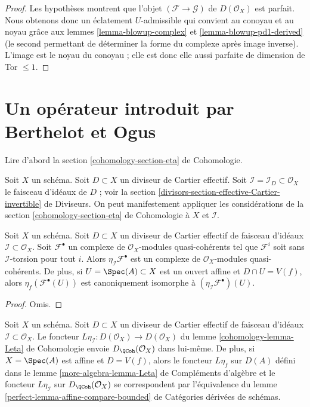 \begin{proof}
Les hypothèses montrent que l'objet $(\mathcal{F} \to \mathcal{G})$
de $D(\mathcal{O}_X)$ est parfait. Nous obtenons donc un éclatement $U$-admissible
qui convient au conoyau et au noyau grâce aux lemmes \ref{lemma-blowup-complex}
et \ref{lemma-blowup-pd1-derived} (le second permettant de déterminer la forme du complexe
après image inverse). L'image est le noyau du conoyau ;
elle est donc elle aussi parfaite de dimension de Tor $\leq 1$.
\end{proof}











\section{Un opérateur introduit par Berthelot et Ogus}
\label{section-eta}

\noindent
Lire d'abord la section \ref{cohomology-section-eta} de Cohomologie.

\medskip\noindent
Soit $X$ un schéma. Soit $D \subset X$ un diviseur de Cartier effectif.
Soit $\mathcal{I} = \mathcal{I}_D \subset \mathcal{O}_X$
le faisceau d'idéaux de $D$ ; voir
la section
\ref{divisors-section-effective-Cartier-invertible} de Diviseurs.
On peut manifestement appliquer les considérations de la section
\ref{cohomology-section-eta} de Cohomologie à $X$ et $\mathcal{I}$.

\begin{lemma}
\label{lemma-eta-stalks}
Soit $X$ un schéma. Soit $D \subset X$ un diviseur de Cartier effectif
de faisceau d'idéaux $\mathcal{I} \subset \mathcal{O}_X$.
Soit $\mathcal{F}^\bullet$ un complexe de
$\mathcal{O}_X$-modules quasi-cohérents tel que $\mathcal{F}^i$ soit
sans $\mathcal{I}$-torsion pour tout $i$. Alors
$\eta_\mathcal{I}\mathcal{F}^\bullet$ est un complexe de
$\mathcal{O}_X$-modules quasi-cohérents. De plus,
si $U = \Spec(A) \subset X$ est un ouvert affine et $D \cap U = V(f)$,
alors $\eta_f(\mathcal{F}^\bullet(U))$ est canoniquement isomorphe
à $(\eta_\mathcal{I}\mathcal{F}^\bullet)(U)$.
\end{lemma}

\begin{proof}
Omis.
\end{proof}

\begin{lemma}
\label{lemma-Leta}
Soit $X$ un schéma. Soit $D \subset X$ un diviseur de Cartier effectif
de faisceau d'idéaux $\mathcal{I} \subset \mathcal{O}_X$.
Le foncteur $L\eta_\mathcal{I} : D(\mathcal{O}_X) \to D(\mathcal{O}_X)$ du
lemme \ref{cohomology-lemma-Leta} de Cohomologie envoie
$D_\QCoh(\mathcal{O}_X)$ dans lui-même.
De plus, si $X = \Spec(A)$ est affine et $D = V(f)$,
alors le foncteur $L\eta_f$ sur $D(A)$ défini dans le
lemme \ref{more-algebra-lemma-Leta} de Compléments d'algèbre
et le foncteur $L\eta_\mathcal{I}$ sur $D_\QCoh(\mathcal{O}_X)$
se correspondent par l'équivalence du lemme
\ref{perfect-lemma-affine-compare-bounded} de Catégories dérivées de schémas.
\end{lemma}

